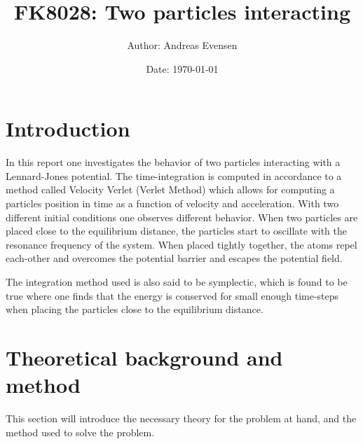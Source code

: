 \documentclass[a4paper]{article}
\title{FK8028: Two particles interacting}
\author{Author: Andreas Evensen}
\date{Date: \today}
\newcommand{\newparagraph}{\vspace{.5cm}\noindent}
\begin{document}
\maketitle
{}
\newpage
{}
\setcounter{page}{1}
\newpage
\tableofcontents
\newpage
{}
\section{Introduction}
In this report one investigates the behavior of two particles interacting with a Lennard-Jones potential. The time-integration is computed in accordance to a method called Velocity Verlet (Verlet Method) which allows for computing a particles position in time as a function of velocity and acceleration.
With two different initial conditions one observes different behavior. When two particles are placed close to the equilibrium distance, the particles start to oscillate with the resonance frequency of the system. 
When placed tightly together, the atoms repel each-other and overcomes the potential barrier and escapes the potential field.

\newparagraph
The integration method used is also said to be symplectic, which is found to be true where one finds that the energy is conserved for small enough time-steps when placing the particles close to the equilibrium distance. 


\section{Theoretical background and method}
This section will introduce the necessary theory for the problem at hand, and the method used to solve the problem.
\end{document}
